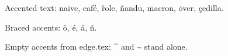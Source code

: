 Accented text: na\"ive, caf\'e, \^role, \~nandu, \=macron, \.over, \c{c}edilla.

Braced accents: \"{o}, \'{e}, \^{a}, \~{n}.

Empty accents from edge.tex: \^{} and \~{} stand alone.
